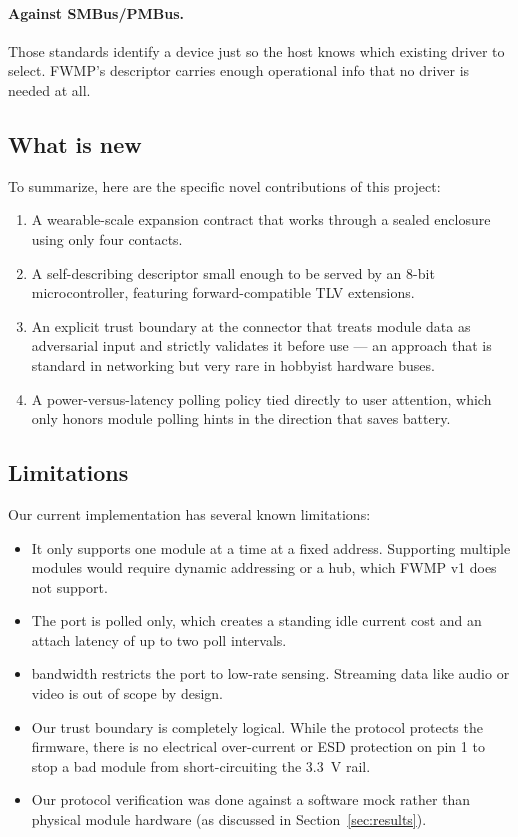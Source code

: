 \documentclass[12pt, a4paper]{article}
\begin{document}
\paragraph{Against SMBus/PMBus.} Those standards identify a device just so the host knows which existing driver to select. FWMP's descriptor carries enough operational info that no driver is needed at all.

\subsection{What is new}

To summarize, here are the specific novel contributions of this project:

\begin{enumerate}
  \item A wearable-scale expansion contract that works through a sealed enclosure using only four contacts.
  \item A self-describing descriptor small enough to be served by an 8-bit microcontroller, featuring forward-compatible TLV extensions.
  \item An explicit trust boundary at the connector that treats module data as adversarial input and strictly validates it before use --- an approach that is standard in networking but very rare in hobbyist hardware buses.
  \item A power-versus-latency polling policy tied directly to user attention, which only honors module polling hints in the direction that saves battery.
\end{enumerate}

\subsection{Limitations}

Our current implementation has several known limitations:

\begin{itemize}
  \item It only supports one module at a time at a fixed address. Supporting multiple modules would require dynamic addressing or a hub, which FWMP v1 does not support.
  \item The port is polled only, which creates a standing idle current cost and an attach latency of up to two poll intervals.
  \item {} bandwidth restricts the port to low-rate sensing. Streaming data like audio or video is out of scope by design.
  \item Our trust boundary is completely logical. While the protocol protects the firmware, there is no electrical over-current or ESD protection on pin 1 to stop a bad module from short-circuiting the \SI{3.3}{\volt} rail.
  \item Our protocol verification was done against a software mock rather than physical module hardware (as discussed in Section~\ref{sec:results}).
\end{itemize}
\end{document}
